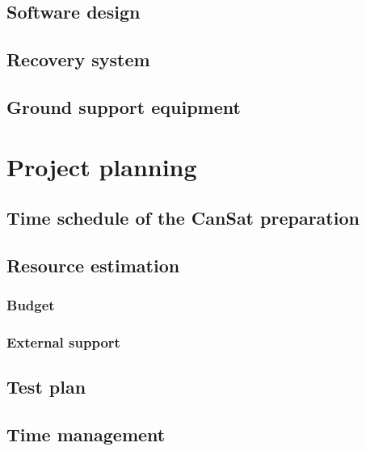 \documentclass[11pt]{article}
\begin{document}
\subsection{Software design}

\subsection{Recovery system}

\subsection{Ground support equipment}

\section{Project planning}

\subsection{Time schedule of the CanSat preparation}

\subsection{Resource estimation}

\subsubsection{Budget}

\subsubsection{External support}

\subsection{Test plan}

\subsection{Time management}
\end{document}
